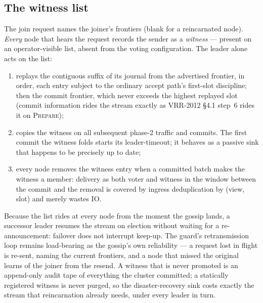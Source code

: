 \subsection{The witness list}
The join request names the joiner's frontiers (blank for a reincarnated
node). \emph{Every} node that hears the request records the sender as a
\emph{witness} --- present on an operator-visible list, absent from the
voting configuration. The leader alone acts on the list:
\begin{enumerate}
\item replays the contiguous suffix of its journal from the advertised
  frontier, in order, each entry subject to the ordinary accept path's
  first-slot discipline; then the commit frontier, which never exceeds the
  highest replayed slot (commit information rides the stream exactly as
  VRR-2012 \S4.1 step~6 rides it on \textsc{Prepare});
\item copies the witness on all subsequent phase-2 traffic and commits.
  The first commit the witness folds starts its leader-timeout; it behaves
  as a passive sink that happens to be precisely up to date;
\item every node removes the witness entry when a committed batch makes the
  witness a member: delivery as both voter and witness in the window
  between the commit and the removal is covered by ingress deduplication
  by (view, slot) and merely wastes IO.
\end{enumerate}
Because the list rides at every node from the moment the gossip lands, a
successor leader resumes the stream on election without waiting for a
re-announcement: failover does not interrupt keep-up. The guard's
retransmission loop remains load-bearing as the gossip's own reliability
--- a request lost in flight is re-sent, naming the current frontiers, and
a node that missed the original learns of the joiner from the resend. A
witness that is never promoted is an append-only audit tape of everything
the cluster committed; a statically registered witness is never purged, so
the disaster-recovery sink costs exactly the stream that reincarnation
already needs, under every leader in turn.

